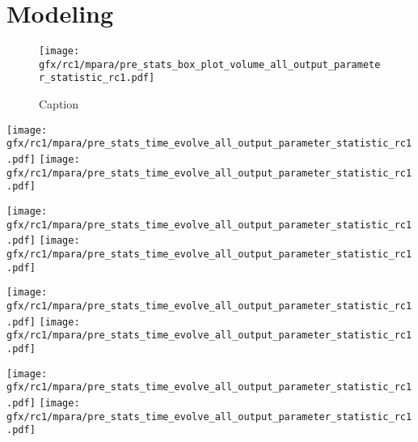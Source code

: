 \chapter{Modeling} %
\label{app:modelAnalysis}
%
%
% 
%
\begin{figure}[!ht]
    \centering
    \texttt{[image: gfx/rc1/mpara/pre\_stats\_box\_plot\_volume\_all\_output\_parameter\_statistic\_rc1.pdf]}
    \caption{Caption}
    \label{app:appModelVolumeBoxPlot}
\end{figure}
%
%
% 
%
%
\setlength{\tikzwidth}{\textwidth}
\begin{sidewaysfigure}[!ht]
\centering
\texttt{[image: gfx/rc1/mpara/pre\_stats\_time\_evolve\_all\_output\_parameter\_statistic\_rc1.pdf]}
\texttt{[image: gfx/rc1/mpara/pre\_stats\_time\_evolve\_all\_output\_parameter\_statistic\_rc1.pdf]}
\label{app:pste1}
\end{sidewaysfigure}
%
\begin{sidewaysfigure}[!ht]
\centering
\texttt{[image: gfx/rc1/mpara/pre\_stats\_time\_evolve\_all\_output\_parameter\_statistic\_rc1.pdf]}
\texttt{[image: gfx/rc1/mpara/pre\_stats\_time\_evolve\_all\_output\_parameter\_statistic\_rc1.pdf]}
\label{app:pste2}
\end{sidewaysfigure}
%
\begin{sidewaysfigure}[!ht]
\centering
\texttt{[image: gfx/rc1/mpara/pre\_stats\_time\_evolve\_all\_output\_parameter\_statistic\_rc1.pdf]}
\texttt{[image: gfx/rc1/mpara/pre\_stats\_time\_evolve\_all\_output\_parameter\_statistic\_rc1.pdf]}
\label{app:pste3}
\end{sidewaysfigure}
%
\begin{sidewaysfigure}[!ht]
\centering
\texttt{[image: gfx/rc1/mpara/pre\_stats\_time\_evolve\_all\_output\_parameter\_statistic\_rc1.pdf]}
\texttt{[image: gfx/rc1/mpara/pre\_stats\_time\_evolve\_all\_output\_parameter\_statistic\_rc1.pdf]}
\label{app:pste4}
\end{sidewaysfigure}
